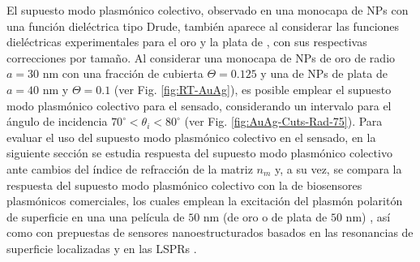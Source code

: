 El supuesto modo plasmónico colectivo, observado en una monocapa de NPs con una función dieléctrica tipo Drude, también aparece al considerar las funciones dieléctricas experimentales para el oro y la plata de \cite{johnson1972constants}, con sus respectivas correcciones por tamaño. Al considerar una monocapa de NPs de oro de radio $a=30$ nm con una fracción de cubierta $\Theta=0.125$ y una de NPs de plata de $a=40$ nm y $\Theta=0.1$ (ver Fig. \ref{fig:RT-AuAg}), es posible emplear el supuesto modo plasmónico colectivo para el sensado, considerando un intervalo para el ángulo de incidencia $70^\circ<\theta_i<80^\circ$ (ver Fig. \ref{fig:AuAg-Cuts-Rad-75}). Para evaluar el uso del supuesto modo plasmónico colectivo en el sensado, en la siguiente sección se estudia  respuesta del supuesto modo plasmónico colectivo ante cambios del índice de refracción de la matriz $n_m$ y, a su vez, se compara la respuesta del supuesto modo plasmónico colectivo con la de biosensores plasmónicos comerciales, los cuales emplean la excitación del plasmón polaritón de superficie en una una película de $50$ nm (de oro o de plata de $50$ nm) \cite{estevez2014trends,svedendahl2009refractometric}, así como con prepuestas de sensores nanoestructurados basados en las resonancias de superficie localizadas \cite{svedendahl2009refractometric} y en las LSPRs \cite{danilov2018ultra}.
